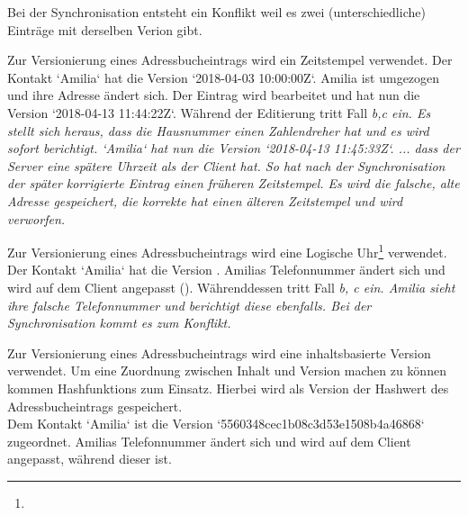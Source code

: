 \begin{description}[leftmargin=0.5cm,style=nextline]
    Bei der Synchronisation entsteht ein Konflikt weil es zwei (unterschiedliche) Einträge mit derselben Verion gibt.\\
  \item[Szenario V1  -- Zeitstempel:]
    Zur Versionierung eines Adressbucheintrags wird ein Zeitstempel verwendet. Der Kontakt `Amilia` hat die Version `2018-04-03 10:00:00Z`.
    Amilia ist umgezogen und ihre Adresse ändert sich. Der Eintrag wird bearbeitet und hat nun die Version `2018-04-13 11:44:22Z`.
    Während der Editierung tritt Fall \it{b,c} ein. Es stellt sich heraus, dass die Hausnummer einen Zahlendreher hat und es wird sofort berichtigt. `Amilia` hat nun die Version `2018-04-13 11:45:33Z`.
    ... dass der Server eine spätere Uhrzeit als der Client hat.
    So hat nach der Synchronisation der später korrigierte Eintrag einen früheren Zeitstempel.
    Es wird die falsche, alte Adresse gespeichert, die korrekte hat einen älteren Zeitstempel und wird verworfen.\\
  \item[Szenario V2 -- Logische Uhr:]%
    Zur Versionierung eines Adressbucheintrags wird eine Logische Uhr\footnote{\logicalclock} verwendet. Der Kontakt `Amilia` hat die Version .
    Amilias Telefonnummer ändert sich und wird auf dem Client angepasst (). Währenddessen tritt Fall \it{b, c} ein. Amilia sieht ihre falsche Telefonnummer und berichtigt diese ebenfalls.
     Bei der Synchronisation kommt es zum Konflikt. \\
  \item[Szenario V3 -- Inhaltsbasierte Version:]%
    Zur Versionierung eines Adressbucheintrags wird eine inhaltsbasierte Version verwendet. Um eine Zuordnung zwischen Inhalt und Version machen zu können kommen \Glspl{Hashfunktion} zum Einsatz. Hierbei wird als Version der Hashwert des Adressbucheintrags gespeichert.\\
    Dem Kontakt `Amilia` ist die Version `5560348cec1b08c3d53e1508b4a46868` zugeordnet. Amilias Telefonnummer ändert sich und wird auf dem Client angepasst, während dieser  ist.

\end{description}
